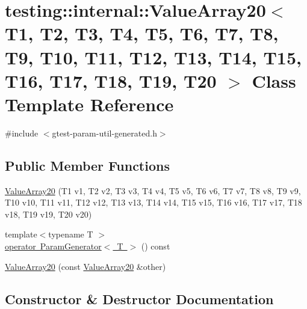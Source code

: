 \hypertarget{classtesting_1_1internal_1_1ValueArray20}{}\section{testing\+::internal\+::Value\+Array20$<$ T1, T2, T3, T4, T5, T6, T7, T8, T9, T10, T11, T12, T13, T14, T15, T16, T17, T18, T19, T20 $>$ Class Template Reference}
\label{classtesting_1_1internal_1_1ValueArray20}


{\ttfamily \#include $<$gtest-\/param-\/util-\/generated.\+h$>$}

\subsection*{Public Member Functions}
\begin{DoxyCompactItemize}
\item 
\mbox{\hyperlink{classtesting_1_1internal_1_1ValueArray20_aafa49e909db9556cdb89692976e80c4a}{Value\+Array20}} (T1 v1, T2 v2, T3 v3, T4 v4, T5 v5, T6 v6, T7 v7, T8 v8, T9 v9, T10 v10, T11 v11, T12 v12, T13 v13, T14 v14, T15 v15, T16 v16, T17 v17, T18 v18, T19 v19, T20 v20)
\item 
{\footnotesize template$<$typename T $>$ }\\\mbox{\hyperlink{classtesting_1_1internal_1_1ValueArray20_abcf63e97d31f62868dab49f1667e9d4f}{operator Param\+Generator$<$ T $>$}} () const
\item 
\mbox{\hyperlink{classtesting_1_1internal_1_1ValueArray20_a965099028a2057212ba388b8017f8e68}{Value\+Array20}} (const \mbox{\hyperlink{classtesting_1_1internal_1_1ValueArray20}{Value\+Array20}} \&other)
\end{DoxyCompactItemize}


\subsection{Constructor \& Destructor Documentation}
\mbox{\label{classtesting_1_1internal_1_1ValueArray20_aafa49e909db9556cdb89692976e80c4a}} 
